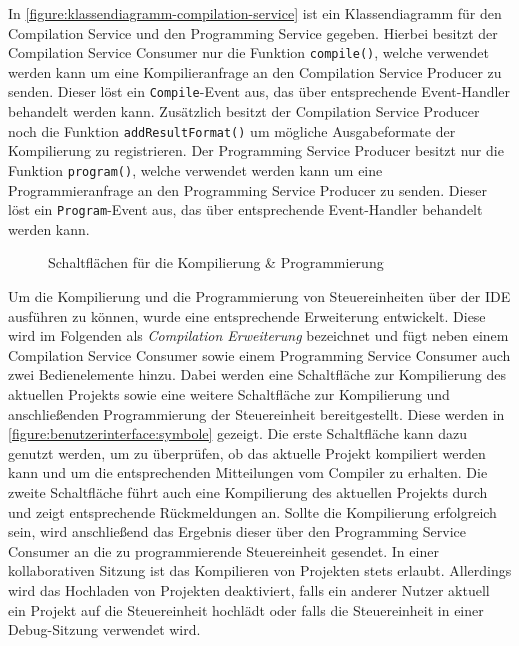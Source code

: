 In \autoref{figure:klassendiagramm-compilation-service} ist ein Klassendiagramm für den Compilation Service und den Programming Service gegeben. Hierbei besitzt der Compilation Service Consumer nur die Funktion \texttt{compile()}, welche verwendet werden kann um eine Kompilieranfrage an den Compilation Service Producer zu senden. Dieser löst ein \texttt{Compile}-Event aus, das über entsprechende Event-Handler behandelt werden kann. Zusätzlich besitzt der Compilation Service Producer noch die Funktion \texttt{addResultFormat()} um mögliche Ausgabeformate der Kompilierung zu registrieren. Der Programming Service Producer besitzt nur die Funktion \texttt{program()}, welche verwendet werden kann um eine Programmieranfrage an den Programming Service Producer zu senden. Dieser löst ein \texttt{Program}-Event aus, das über entsprechende Event-Handler behandelt werden kann.

\begin{figure}[tbp]
    \centering
    \caption{Schaltflächen für die Kompilierung \& Programmierung}
    \label{figure:benutzerinterface:symbole}
\end{figure}

Um die Kompilierung und die Programmierung von Steuereinheiten über der IDE ausführen zu können, wurde eine entsprechende Erweiterung entwickelt. Diese wird im Folgenden als \textit{Compilation Erweiterung} bezeichnet und fügt neben einem Compilation Service Consumer sowie einem Programming Service Consumer auch zwei Bedienelemente hinzu. Dabei werden eine Schaltfläche zur Kompilierung des aktuellen Projekts sowie eine weitere Schaltfläche zur Kompilierung und anschließenden Programmierung der Steuereinheit bereitgestellt. Diese werden in \autoref{figure:benutzerinterface:symbole} gezeigt. Die erste Schaltfläche kann dazu genutzt werden, um zu überprüfen, ob das aktuelle Projekt kompiliert werden kann und um die entsprechenden Mitteilungen vom Compiler zu erhalten. Die zweite Schaltfläche führt auch eine Kompilierung des aktuellen Projekts durch und zeigt entsprechende Rückmeldungen an. Sollte die Kompilierung erfolgreich sein, wird anschließend das Ergebnis dieser über den Programming Service Consumer an die zu programmierende Steuereinheit gesendet. In einer kollaborativen Sitzung ist das Kompilieren von Projekten stets erlaubt. Allerdings wird das Hochladen von Projekten deaktiviert, falls ein anderer Nutzer aktuell ein Projekt auf die Steuereinheit hochlädt oder falls die Steuereinheit in einer Debug-Sitzung verwendet wird.

